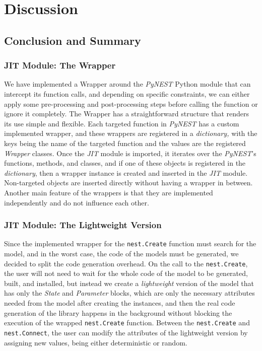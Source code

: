 \chapter{Discussion}
 \label{chap:disc}
\section{Conclusion and Summary}

\subsection*{JIT Module: The Wrapper}

We have implemented a Wrapper around the \emph{PyNEST} Python module that can intercept its function calls, and depending on specific constraints, we can either apply some pre-processing and post-processing steps before calling the function or ignore it completely. The Wrapper has a straightforward structure that renders its use simple and flexible. Each targeted function in \emph{PyNEST} has a custom implemented wrapper, and these wrappers are registered in a \emph{dictionary,} with the keys being the name of the targeted function and the values are the registered \emph{Wrapper} classes. Once the \emph{JIT} module is imported, it iterates over the \emph{PyNEST}'s functions, methods, and classes, and if one of these objects is registered in the \emph{dictionary}, then a wrapper instance is created and inserted in the \emph{JIT} module. Non-targeted objects are inserted directly without having a wrapper in between. Another main feature of the wrappers is that they are implemented independently and do not influence each other.

\subsection*{JIT Module: The Lightweight Version}

Since the implemented wrapper for the \texttt{nest.Create} function must search for the model, and in the worst case, the code of the models must be generated, we decided to split the code generation overhead. On the call to the \texttt{nest.Create}, the user will not need to wait for the whole code of the model to be generated, built, and installed, but instead we create a \emph{lightweight} version of the model that has only the \emph{State} and \emph{Parameter} blocks, which are only the necessary attributes needed from the model after creating the instances, and then the real code generation of the library happens in the background without blocking the execution of the wrapped \texttt{nest.Create} function. Between the \texttt{nest.Create} and \texttt{nest.Connect}, the user can modify the attributes of the lightweight version by assigning new values, being either deterministic or random.


